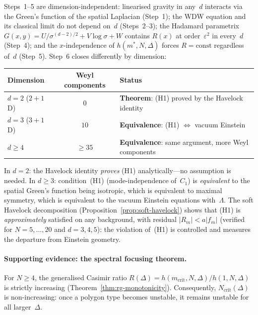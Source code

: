\begin{remark}
\label{rmk:higher-d}
Steps~1--5 are dimension-independent: linearised gravity
in any~$d$ interacts via the Green's function of the spatial
Laplacian (Step~1); the WDW equation and its classical limit
do not depend on~$d$ (Steps~2--3); the Hadamard parametrix
$G(x,y) = U/\sigma^{(d-2)/2} + V\log\sigma + W$ contains
$R(x)$ at order~$\varepsilon^2$ in every~$d$ (Step~4);
and the $x$-independence of $h(m^*,N,\Delta)$ forces
$R = \mathrm{const}$ regardless of~$d$ (Step~5).
Step~6 closes differently by dimension:

\medskip
\begin{center}
\small
\begin{tabular}{lcl}
\toprule
Dimension & Weyl components & Status \\
\midrule
$d = 2$ ($2{+}1$D) & $0$ &
  \textbf{Theorem}: (H1) proved by the Havelock identity \\
$d = 3$ ($3{+}1$D) & $10$ &
  \textbf{Equivalence}: (H1) $\Leftrightarrow$ vacuum Einstein \\
$d \ge 4$ & $\ge 35$ &
  \textbf{Equivalence}: same argument, more Weyl components \\
\bottomrule
\end{tabular}
\end{center}
\medskip

\noindent
In $d = 2$: the Havelock identity \emph{proves} (H1)
analytically---no assumption is needed.
In $d \ge 3$: condition~(H1) (mode-independence of~$C_1$) is
\emph{equivalent} to the spatial Green's function being isotropic,
which is equivalent to maximal symmetry, which is equivalent
to the vacuum Einstein equations with~$\Lambda$.
The soft Havelock decomposition
(Proposition~\ref{prop:soft-havelock})
shows that (H1) is \emph{approximately} satisfied on any background,
with residual $|R_m| < a|f_m|$ (verified for $N = 5,\ldots,20$
and $d = 3, 4, 5$):
the violation of~(H1) is controlled and measures
the departure from Einstein geometry.
\end{remark}

\paragraph{Supporting evidence: the spectral focusing theorem.}

\begin{theorem}
\label{thm:focusing}
For $N \ge 4$, the generalised Casimir ratio
$R(\Delta) = h(m_{\mathrm{crit}},N,\Delta)/h(1,N,\Delta)$
is strictly increasing (Theorem~\ref{thm:rg-monotonicity}).
Consequently, $N_{\mathrm{crit}}(\Delta)$
is non-increasing: once a polygon type becomes unstable,
it remains unstable for all larger~$\Delta$.
\end{theorem}


